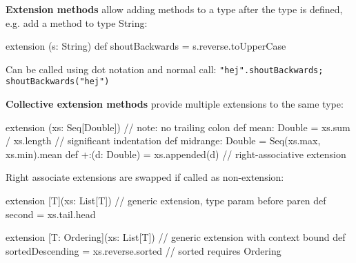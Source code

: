 \documentclass[article, a5paper]{memoir}
\newcommand{\LangColor}{scalared}
\newcommand{\head}[1]{{\bfseries {\color{\LangColor}{#1}}\par\vspace{1mm}\hrule\vspace{-2mm}}}
\newcommand{\code}{\lstinline[basicstyle=\ttfamily]}
\newcommand{\Newline}{\vspace{\baselineskip}}
\begin{document}
\vspace*{-2.75em}\head{Extension methods}\Newline
{\small
\textbf{Extension methods} allow adding methods to a type after the type is defined, e.g. add a method to type String:
\vspace*{-0.5em}\begin{Code}
extension (s: String) def shoutBackwards = s.reverse.toUpperCase 
\end{Code} 
\vspace*{-0.45em} Can be called using dot notation and normal call: \code|"hej".shoutBackwards; shoutBackwards("hej")|

\vspace*{0.25em}\textbf{Collective extension methods} provide multiple extensions to the same type:
\vspace*{-0.5em}\begin{Code}
extension (xs: Seq[Double])                       // note: no trailing colon
  def mean: Double = xs.sum / xs.length           // significant indentation
  def midrange: Double = Seq(xs.max, xs.min).mean
  def +:(d: Double) = xs.appended(d)          // right-associative extension
\end{Code} 
\vspace*{-0.25em}Right associate extensions are swapped if called as non-extension: 
\vspace*{-0.5em}\begin{Code}
extension [T](xs: List[T])     // generic extension, type param before paren
  def second = xs.tail.head
\end{Code} 
\vspace*{-0.96em}\begin{Code}
extension [T: Ordering](xs: List[T]) // generic extension with context bound
  def sortedDescending = xs.reverse.sorted       // sorted requires Ordering 
\end{Code} 
}
\end{document}
